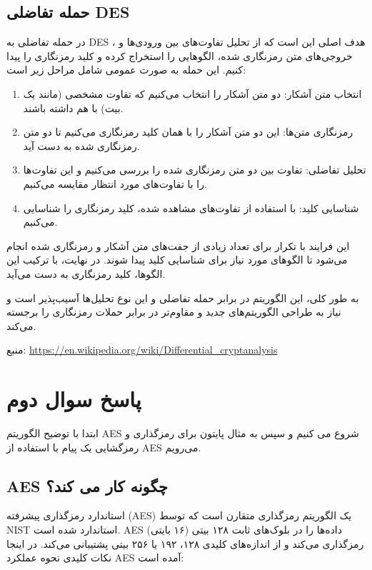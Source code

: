 \subsection*{حمله تفاضلی DES}
در حمله تفاضلی به DES
، هدف اصلی این است که از تحلیل تفاوت‌های بین ورودی‌ها و خروجی‌های متن رمزنگاری شده، الگوهایی را استخراج کرده و کلید رمزنگاری را پیدا کنیم. این حمله به صورت عمومی شامل مراحل زیر است:
\begin{enumerate}
    \item انتخاب متن آشکار: دو متن آشکار را انتخاب می‌کنیم که تفاوت مشخصی (مانند یک بیت) با هم داشته باشند.
    \item رمزنگاری متن‌ها: این دو متن آشکار را با همان کلید رمزنگاری می‌کنیم تا دو متن رمزنگاری شده به دست آید.
    \item تحلیل تفاضلی: تفاوت بین دو متن رمزنگاری شده را بررسی می‌کنیم و این تفاوت‌ها را با تفاوت‌های مورد انتظار مقایسه می‌کنیم.
    \item شناسایی کلید: با استفاده از تفاوت‌های مشاهده شده، کلید رمزنگاری را شناسایی می‌کنیم.
\end{enumerate}

این فرایند با تکرار برای تعداد زیادی از جفت‌های متن آشکار و رمزنگاری شده انجام می‌شود تا الگوهای مورد نیاز برای شناسایی کلید پیدا شوند. در نهایت، با ترکیب این الگوها، کلید رمزنگاری به دست می‌آید.

به طور کلی، این الگوریتم در برابر حمله تفاضلی و این نوع تحلیل‌ها آسیب‌پذیر است و نیاز به طراحی الگوریتم‌های جدید و مقاوم‌تر در برابر حملات رمزنگاری را برجسته می‌کند.

منبع:
\url{https://en.wikipedia.org/wiki/Differential_cryptanalysis}

\section*{پاسخ سوال دوم}
ابتدا با توضیح الگوریتم AES شروع می کنیم و سپس به مثال پایتون برای رمزگذاری و رمزگشایی یک پیام با استفاده از AES می‌رویم.

\subsection*{AES چگونه کار می کند؟}
استاندارد رمزگذاری پیشرفته (AES) یک الگوریتم رمزگذاری متقارن است که توسط NIST استاندارد شده است. AES داده‌ها را در بلوک‌های ثابت ۱۲۸ بیتی (۱۶ بایتی) رمزگذاری می‌کند و از اندازه‌های کلیدی ۱۲۸، ۱۹۲ یا ۲۵۶ بیتی پشتیبانی می‌کند. در اینجا نکات کلیدی نحوه عملکرد AES آمده است:

